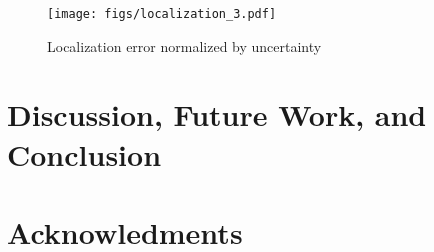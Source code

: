 \documentclass[twocolumn]{aastex631}
\begin{document}
\begin{figure*}[h]
    \centering
    \texttt{[image: figs/localization\_3.pdf]}
    \caption{Localization error normalized by uncertainty}   
    \label{fig:locbw}
\end{figure*}

\section{Discussion, Future Work, and Conclusion}

\section{Acknowledments}
\appendix
%
\onecolumngrid


{}


\end{document}
